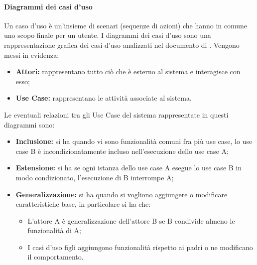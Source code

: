 \paragraph*{Diagrammi dei casi d'uso}
Un caso d'uso è un'insieme di scenari (sequenze di azioni) che hanno in comune uno scopo finale per un utente. I diagrammi dei casi d'uso sono una rappresentazione grafica dei casi d'uso analizzati nel documento di \AdRv. Vengono messi in evidenza:
\begin{itemize}
	\item \textbf{Attori:} rappresentano tutto ciò che è esterno al sistema e interagisce con esso;
	\item \textbf{Use Case:} rappresentano le attività associate al sistema.
\end{itemize}
Le eventuali relazioni tra gli Use Case del sistema rappresentate in questi diagrammi sono: 
\begin{itemize}
	\item \textbf{Inclusione:} si ha quando vi sono funzionalità comuni fra più use case, lo use case B è incondizionatamente incluso nell'esecuzione dello use case A;
	\item \textbf{Estensione:} si ha se ogni istanza dello use case A esegue lo use case B in modo condizionato, l'esecuzione di B interrompe A;
	\item \textbf{Generalizzazione:} si ha quando si vogliono aggiungere o modificare caratteristiche base, in particolare si ha che:
	\begin{itemize}
		\item L'attore A è generalizzazione dell'attore B se B condivide almeno le funzionalità di A;
		\item I casi d'uso figli aggiungono funzionalità rispetto ai padri o ne modificano il comportamento.
	\end{itemize}
\end{itemize} 



